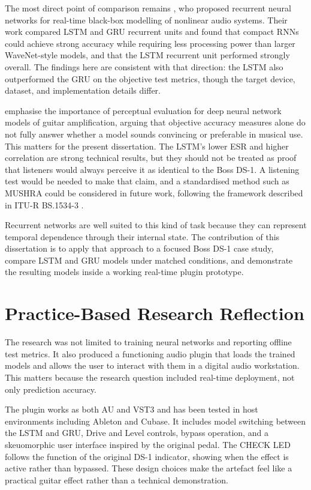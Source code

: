 The most direct point of comparison remains \citet{wright_real-time_2019}, who proposed recurrent neural networks for real-time black-box modelling of nonlinear audio systems. Their work compared LSTM and GRU recurrent units and found that compact RNNs could achieve strong accuracy while requiring less processing power than larger WaveNet-style models, and that the LSTM recurrent unit performed strongly overall. The findings here are consistent with that direction: the LSTM also outperformed the GRU on the objective test metrics, though the target device, dataset, and implementation details differ.

\citet{cassidy_perceptual_2023} emphasise the importance of perceptual evaluation for deep neural network models of guitar amplification, arguing that objective accuracy measures alone do not fully answer whether a model sounds convincing or preferable in musical use. This matters for the present dissertation. The LSTM's lower ESR and higher correlation are strong technical results, but they should not be treated as proof that listeners would always perceive it as identical to the Boss DS-1. A listening test would be needed to make that claim, and a standardised method such as MUSHRA could be considered in future work, following the framework described in ITU-R BS.1534-3 \citep{ITU_BS1534_3}.

Recurrent networks are well suited to this kind of task because they can represent temporal dependence through their internal state. The contribution of this dissertation is to apply that approach to a focused Boss DS-1 case study, compare LSTM and GRU models under matched conditions, and demonstrate the resulting models inside a working real-time plugin prototype.

\section{Practice-Based Research Reflection}

The research was not limited to training neural networks and reporting offline test metrics. It also produced a functioning audio plugin that loads the trained models and allows the user to interact with them in a digital audio workstation. This matters because the research question included real-time deployment, not only prediction accuracy.

The plugin works as both AU and VST3 and has been tested in host environments including Ableton and Cubase. It includes model switching between the LSTM and GRU, Drive and Level controls, bypass operation, and a skeuomorphic user interface inspired by the original pedal. The CHECK LED follows the function of the original DS-1 indicator, showing when the effect is active rather than bypassed. These design choices make the artefact feel like a practical guitar effect rather than a technical demonstration.

